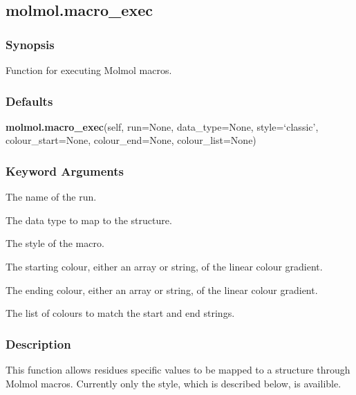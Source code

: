 
  

 \newpage 

 \subsection{molmol.macro\_exec} 

  
 \subsubsection{Synopsis} 

 Function for executing Molmol macros. 
  

  
 \subsubsection{Defaults} 

 \textsf{\textbf{molmol.macro\_exec}(self, run=None, data\_type=None, style=`classic', colour\_start=None, colour\_end=None, colour\_list=None)} 

  
 \subsubsection{Keyword Arguments} 

   The name of the run.   

   The data type to map to the structure.   

   The style of the macro.   

   The starting colour, either an array or string, of the linear colour gradient.   

   The ending colour, either an array or string, of the linear colour gradient.   

   The list of colours to match the start and end strings.  

  

  
 \subsubsection{Description} 

 This function allows residues specific values to be mapped to a structure through Molmol macros.  Currently only the  style, which is described below, is availible. 
  

